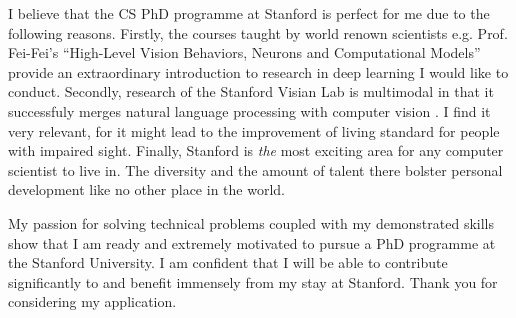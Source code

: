 \documentclass[12pt]{article}
\begin{document}
I believe that the CS PhD programme at Stanford is perfect for me due to the following reasons. Firstly, the courses taught by world renown scientists e.g. Prof. Fei-Fei's ``High-Level Vision Behaviors, Neurons and Computational Models'' provide an extraordinary introduction to research in deep learning I would like to conduct. Secondly, research of the Stanford Visian Lab is multimodal in that it successfuly merges natural language processing with computer vision \cite{imageannot}. I find it very relevant, for it might lead to the improvement of living standard for people with impaired sight. Finally, Stanford is \emph{the} most exciting area for any computer scientist to live in. The diversity and the amount of talent there bolster personal development like no other place in the world.

My passion for solving technical problems coupled with my demonstrated skills show that I am ready and extremely motivated to pursue a PhD programme at the Stanford University. I am confident that I will be able to contribute significantly to and benefit immensely from my stay at Stanford. Thank you for considering my application.



\end{document}
